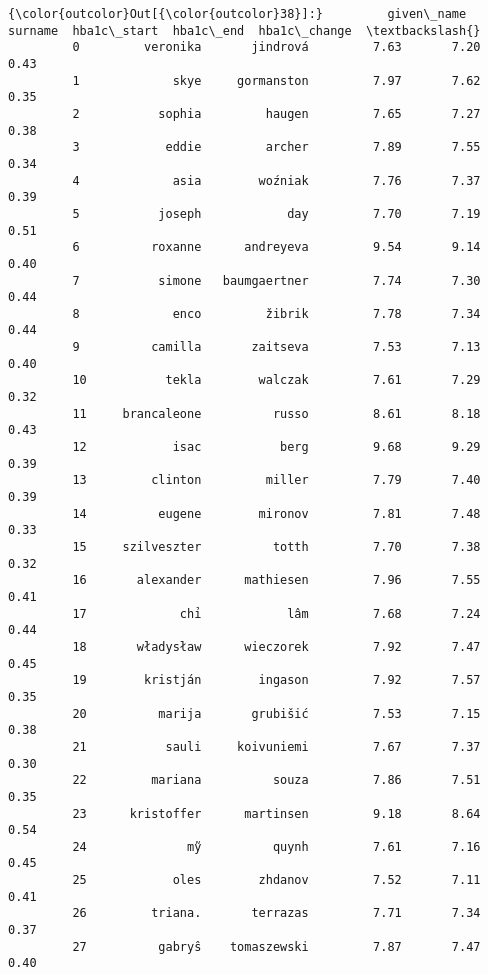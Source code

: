 \documentclass[11pt]{article}
\begin{document}
\begin{Verbatim}[commandchars=\\\{\}]
{\color{outcolor}Out[{\color{outcolor}38}]:}         given\_name        surname  hba1c\_start  hba1c\_end  hba1c\_change  \textbackslash{}
         0         veronika       jindrová         7.63       7.20          0.43   
         1             skye     gormanston         7.97       7.62          0.35   
         2           sophia         haugen         7.65       7.27          0.38   
         3            eddie         archer         7.89       7.55          0.34   
         4             asia        woźniak         7.76       7.37          0.39   
         5           joseph            day         7.70       7.19          0.51   
         6          roxanne      andreyeva         9.54       9.14          0.40   
         7           simone   baumgaertner         7.74       7.30          0.44   
         8             enco         žibrik         7.78       7.34          0.44   
         9          camilla       zaitseva         7.53       7.13          0.40   
         10           tekla        walczak         7.61       7.29          0.32   
         11     brancaleone          russo         8.61       8.18          0.43   
         12            isac           berg         9.68       9.29          0.39   
         13         clinton         miller         7.79       7.40          0.39   
         14          eugene        mironov         7.81       7.48          0.33   
         15     szilveszter          totth         7.70       7.38          0.32   
         16       alexander      mathiesen         7.96       7.55          0.41   
         17             chỉ            lâm         7.68       7.24          0.44   
         18       władysław      wieczorek         7.92       7.47          0.45   
         19        kristján        ingason         7.92       7.57          0.35   
         20          marija       grubišić         7.53       7.15          0.38   
         21           sauli     koivuniemi         7.67       7.37          0.30   
         22         mariana          souza         7.86       7.51          0.35   
         23      kristoffer      martinsen         9.18       8.64          0.54   
         24              mỹ          quynh         7.61       7.16          0.45   
         25            oles        zhdanov         7.52       7.11          0.41   
         26         triana.       terrazas         7.71       7.34          0.37   
         27          gabryŝ    tomaszewski         7.87       7.47          0.40   

\end{Verbatim}
\end{document}
